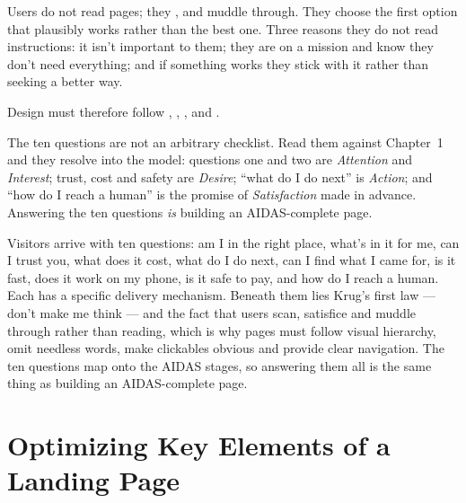 \documentclass{MMTextbook}
\begin{document}
Users do not read pages; they ,  and muddle
through. They choose the first option that plausibly works rather than the best
one. Three reasons they do not read instructions: it isn't important to them; they
are on a mission and know they don't need everything; and if something works they
stick with it rather than seeking a better way.

Design must therefore follow , ,
, and .

\begin{warnbox}
The ten questions are not an arbitrary checklist. Read them against
Chapter~1 and they resolve into the model: questions one and two are
\emph{Attention} and \emph{Interest}; trust, cost and safety are \emph{Desire};
``what do I do next'' is \emph{Action}; and ``how do I reach a human'' is the
promise of \emph{Satisfaction} made in advance. Answering the ten questions
\emph{is} building an AIDAS-complete page.
\end{warnbox}

\begin{summarybox}
Visitors arrive with ten questions: am I in the right place, what's in it for me,
can I trust you, what does it cost, what do I do next, can I find what I came for,
is it fast, does it work on my phone, is it safe to pay, and how do I reach a
human. Each has a specific delivery mechanism. Beneath them lies Krug's first law
--- don't make me think --- and the fact that users scan, satisfice and muddle
through rather than reading, which is why pages must follow visual hierarchy, omit
needless words, make clickables obvious and provide clear navigation. The ten
questions map onto the AIDAS stages, so answering them all is the same thing as
building an AIDAS-complete page.
\end{summarybox}

\chapter{Optimizing Key Elements of a Landing Page}

\end{document}
